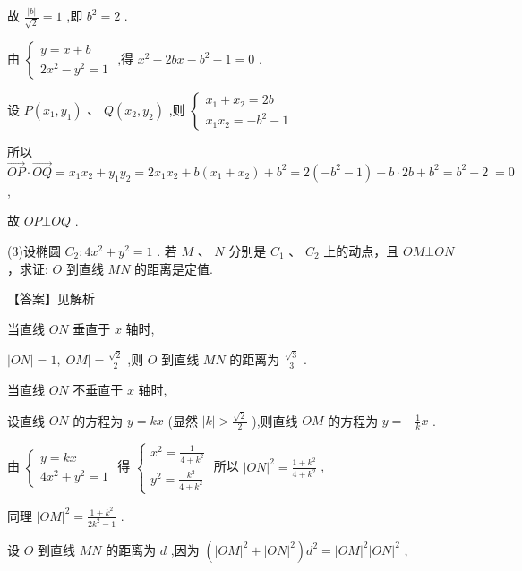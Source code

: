 \documentclass[10pt]{article}
\begin{document}
故 \(\frac{\left| b\right| }{\sqrt{2}} = 1\) ,即 \({b}^{2} = 2\) .

由 \(\left\{  \begin{array}{l} y = x + b \\  2{x}^{2} - {y}^{2} = 1 \end{array}\right.\) ,得 \({x}^{2} - {2bx} - {b}^{2} - 1 = 0\) .

设 \(P\left( {{x}_{1},{y}_{1}}\right) \text{ 、 }Q\left( {{x}_{2},{y}_{2}}\right)\) ,则 \(\left\{  \begin{array}{l} {x}_{1} + {x}_{2} = {2b} \\  {x}_{1}{x}_{2} =  - {b}^{2} - 1 \end{array}\right.\)

所以 \(\overrightarrow{OP} \cdot  \overrightarrow{OQ} = {x}_{1}{x}_{2} + {y}_{1}{y}_{2} = 2{x}_{1}{x}_{2} + b\left( {{x}_{1} + {x}_{2}}\right)  + {b}^{2} = 2\left( {-{b}^{2} - 1}\right)  + b \cdot  {2b} + {b}^{2} = {b}^{2} - 2 \; = 0\) ,

故 \({OP} \bot  {OQ}\) .

(3)设椭圆 \({C}_{2} : 4{x}^{2} + {y}^{2} = 1\) . 若 \(M\) 、 \(N\) 分别是 \({C}_{1}\) 、 \({C}_{2}\) 上的动点，且 \({OM}\bot {ON}\) ，求证: \(O\) 到直线 \({MN}\) 的距离是定值.

【答案】见解析

当直线 \({ON}\) 垂直于 \(x\) 轴时,

\(\left| {ON}\right|  = 1,\left| {OM}\right|  = \frac{\sqrt{2}}{2}\) ,则 \(O\) 到直线 \({MN}\) 的距离为 \(\frac{\sqrt{3}}{3}\) .

当直线 \({ON}\) 不垂直于 \(x\) 轴时,

设直线 \({ON}\) 的方程为 \(y = {kx}\) (显然 \(\left| k\right|  > \frac{\sqrt{2}}{2}\) ),则直线 \({OM}\) 的方程为 \(y =  - \frac{1}{k}x\) .

由 \(\left\{  \begin{array}{l} y = {kx} \\  4{x}^{2} + {y}^{2} = 1 \end{array}\right.\) 得 \(\left\{  \begin{array}{l} {x}^{2} = \frac{1}{4 + {k}^{2}} \\  {y}^{2} = \frac{{k}^{2}}{4 + {k}^{2}} \end{array}\right.\) 所以 \({\left| ON\right| }^{2} = \frac{1 + {k}^{2}}{4 + {k}^{2}}\) ,

同理 \({\left| OM\right| }^{2} = \frac{1 + {k}^{2}}{2{k}^{2} - 1}\) .

设 \(O\) 到直线 \({MN}\) 的距离为 \(d\) ,因为 \(\left( {{\left| OM\right| }^{2} + {\left| ON\right| }^{2}}\right) {d}^{2} = {\left| OM\right| }^{2}{\left| ON\right| }^{2}\) ,
\end{document}
